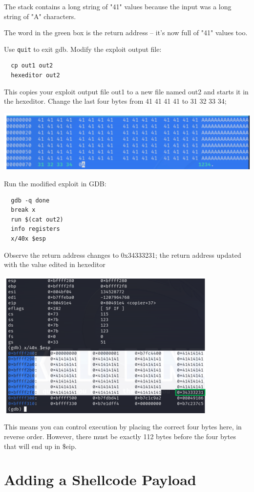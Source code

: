 \documentclass[]{project_plan}
\begin{document}
The stack contains a long string of "41" values because the input was a
long string of "A" characters.

The word in the green box is the return address – it’s now full of "41"
values too.

Use \lstinline|quit| to exit gdb. Modify the exploit output file:
\begin{lstlisting}
  cp out1 out2
  hexeditor out2
\end{lstlisting}

This copies your exploit output file out1 to a new file named out2 and
starts it in the hexeditor. Change the last four bytes from 41 41 41 41 to 31
32 33 34;

\includegraphics[width=.8\linewidth]{lab4 edit last 4.png}

Run the modified exploit in GDB:
\begin{lstlisting}
  gdb -q done
  break x
  run $(cat out2)
  info registers
  x/40x $esp
\end{lstlisting}
Observe the return address changes to 0x34333231; the return address updated with the value
edited in hexeditor

\includegraphics[width=.8\linewidth]{lab4 updated returned val.png}

This means you can control execution by placing the correct four bytes
here, in reverse order. However, there must be exactly 112 bytes before
the four bytes that will end up in \$eip.

\section{Adding a Shellcode Payload}
\end{document}
